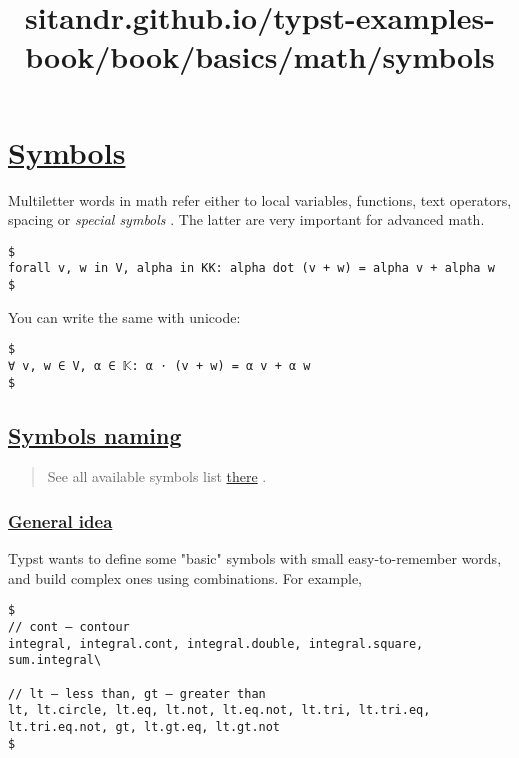 \title{sitandr.github.io/typst-examples-book/book/basics/math/symbols}

\section{\texorpdfstring{\hyperref[symbols]{Symbols}}{Symbols}}\label{symbols}

Multiletter words in math refer either to local variables, functions,
text operators, spacing or \emph{special symbols} . The latter are very
important for advanced math.

\begin{verbatim}
$
forall v, w in V, alpha in KK: alpha dot (v + w) = alpha v + alpha w
$
\end{verbatim}

\pandocbounded{}

You can write the same with unicode:

\begin{verbatim}
$
∀ v, w ∈ V, α ∈ 𝕂: α ⋅ (v + w) = α v + α w
$
\end{verbatim}

\pandocbounded{}

\subsection{\texorpdfstring{\hyperref[symbols-naming]{Symbols
naming}}{Symbols naming}}\label{symbols-naming}

\begin{quote}
See all available symbols list
\href{https://typst.app/docs/reference/symbols/sym/}{there} .
\end{quote}

\subsubsection{\texorpdfstring{\hyperref[general-idea]{General
idea}}{General idea}}\label{general-idea}

Typst wants to define some "basic" symbols with small easy-to-remember
words, and build complex ones using combinations. For example,

\begin{verbatim}
$
// cont — contour
integral, integral.cont, integral.double, integral.square, sum.integral\

// lt — less than, gt — greater than
lt, lt.circle, lt.eq, lt.not, lt.eq.not, lt.tri, lt.tri.eq, lt.tri.eq.not, gt, lt.gt.eq, lt.gt.not
$
\end{verbatim}

